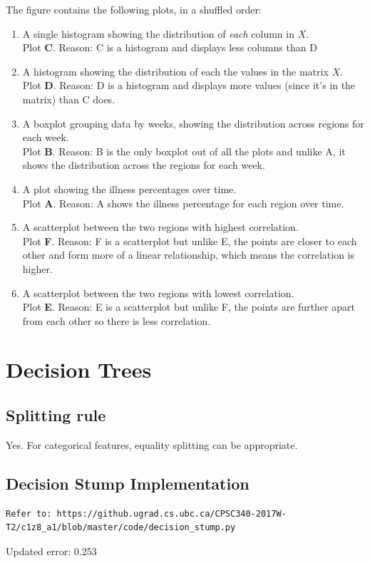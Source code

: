 \documentclass{article}
\def\blu#1{{\color{blu}#1}}
\def\enum#1{\begin{enumerate}#1\end{enumerate}}
\begin{document}
The figure contains the following plots, in a shuffled order:
\enum{
\item A single histogram showing the distribution of \emph{each} column in $X$.
\\ Plot \textbf{C}. \blu{Reason:} C is a histogram and displays less columns than D 
\item A histogram showing the distribution of each the values in the matrix $X$.
\\ Plot \textbf{D}. \blu{Reason:} D is a histogram and displays more values (since it's in the matrix) than C does.
\item A boxplot grouping data by weeks, showing the distribution across regions for each week.
\\ Plot \textbf{B}. \blu{Reason:} B is the only boxplot out of all the plots and unlike A, it shows the distribution across the regions for each week.
\item A plot showing the illness percentages over time.
\\ Plot \textbf{A}. \blu{Reason:} A shows the illness percentage for each region over time. 
\item A scatterplot between the two regions with highest correlation.
\\ Plot \textbf{F}. \blu{Reason:} F is a scatterplot but unlike E, the points are closer to each other and form more of a linear relationship, which means the correlation is higher. 
\item A scatterplot between the two regions with lowest correlation.
\\ Plot \textbf{E}. \blu{Reason:} E is a scatterplot but unlike F, the points are further apart from each other so there is less correlation. 
}

\section{Decision Trees}

\subsection{Splitting rule}

Yes. For categorical features, equality splitting can be appropriate.

\subsection{Decision Stump Implementation}
\begin{verbatim}
Refer to: https://github.ugrad.cs.ubc.ca/CPSC340-2017W-T2/c1z8_a1/blob/master/code/decision_stump.py
\end{verbatim}
Updated error: \blu{0.253}
\end{document}
